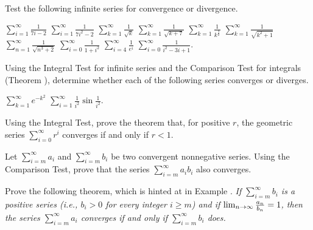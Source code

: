 \begin{exercises}

Test the following infinite series for
convergence or divergence.
\begin{exenum}
\x
$\sum_{i=1}^\infty \frac{1}{7i-2}$
\x
$\sum_{i=1}^\infty \frac{1}{7i^2-2}$
\x
$\sum_{k=1}^\infty \frac{1}{\sqrt{k}}$
\x
$\sum_{k=1}^\infty \frac{1}{\sqrt{k+7}}$
\x
$\sum_{k=1}^\infty \frac{1}{k^{\frac32}}$
\x
$\sum_{k=1}^\infty \frac{1}{\sqrt{k^2+1}}$
\x
$\sum_{n=1}^\infty \frac{1}{\sqrt{n^3+2}}$
\x
$\sum_{i=0}^\infty \frac{1}{1+i^2}$
\x
$\sum_{i=4}^\infty \frac{1}{e^i}$
\x
$\sum_{i=0}^\infty \frac{1}{i^2-3i+1}$.
\end{exenum}

Using the Integral Test for infinite series and the
Comparison Test for integrals (Theorem ),
determine whether each of the following series
converges or diverges.
\begin{exenum}
\x
$\sum_{k=1}^\infty e^{-k^2}$
\x
$\sum_{i=1}^\infty \frac1{i^2} \sin \frac1{i^2}$.
\end{exenum}

Using the Integral Test, prove the theorem that,
for positive $r$, the geometric series
$\sum_{i=0}^\infty r^i$ converges if and only if
$r<1$.

Let $\sum_{i=m}^\infty a_i$ and
$\sum_{i=m}^\infty b_i$ be two convergent
nonnegative series.  Using the Comparison Test,
prove that the series $\sum_{i=m}^\infty a_ib_i$
also converges.

Prove the following theorem, which is hinted at
in Example .
\emph{If $\sum_{i=m}^\infty b_i$ is a positive series
(i.e., $b_i > 0$ for every integer $i \geq m$)
and if $\lim_{n\rightarrow\infty} \frac{a_n}{b_n} = 1$,
then the series $\sum_{i=m}^\infty a_i$
converges if and only if
$\sum_{i=m}^\infty b_i$ does.}

\end{exercises}
